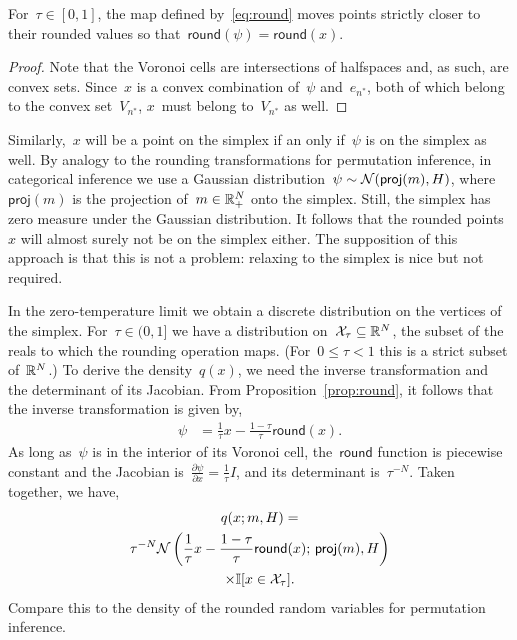 \begin{proposition}
  \label{prop:round}
  For~${\tau \in [0,1]}$, the map defined by~\eqref{eq:round} moves
  points strictly closer to their rounded values so
  that~$\mathsf{round}(\psi) = \mathsf{round}(x)$.
\end{proposition}

\begin{proof}
  Note that the Voronoi cells are intersections of halfspaces
  and, as such, are convex sets.  Since~$x$ is a convex combination
  of~$\psi$ and~$e_{n^*}$, both of which belong to the convex
  set~$V_{n^*}$, $x$~must belong to~$V_{n^*}$ as well.
\end{proof}

Similarly,~$x$ will be a point on the simplex if an only if~$\psi$ is
on the simplex as well.  By analogy to the rounding transformations
for permutation inference, in categorical inference we use a Gaussian
distribution~${\psi \sim \mathcal{N}(\mathsf{proj}(m), H)}$,
where~$\mathsf{proj}(m)$ is the projection of~$m \in \mathbb{R}_+^N$ onto
the simplex.  Still, the simplex has zero measure under the Gaussian
distribution.  It follows that the rounded points~$x$ will almost
surely not be on the simplex either.  The supposition of this approach
is that this is not a problem: relaxing to the simplex is nice but not
required.

In the zero-temperature limit we obtain a discrete distribution on the
vertices of the simplex.  For~${\tau \in (0,1]}$ we have a
distribution on~${\mathcal{X}_\tau \subseteq \mathbb{R}^N}$, the subset of the
reals to which the rounding operation maps. (For~${0 \leq \tau < 1}$
this is a strict subset of~$\mathbb{R}^N$.) To derive the
density~$q(x)$, we need the inverse transformation and the
determinant of its Jacobian.  From Proposition~\ref{prop:round}, it
follows that the inverse transformation is given by,
\begin{align*}
  \psi &= \frac{1}{\tau} x - \frac{1 - \tau}{\tau} \mathsf{round}(x).
\end{align*}
As long as~$\psi$ is in the interior of its Voronoi cell,
the~$\mathsf{round}$ function is piecewise constant and the
Jacobian is~${\tfrac{\partial\psi}{\partial x} = \tfrac{1}{\tau} I}$,
and its determinant is~$\tau^{-N}$. Taken together, we have,
\begin{multline*}
  q(x; m, H) =  \\
  \tau^{-N} \mathcal{N} \left(\frac{1}{\tau}x - \frac{1-\tau}{\tau} \mathsf{round}(x); \, \mathsf{proj}(m), H \right) \\
  \times \mathbb{I}[x \in \mathcal{X}_\tau].
\end{multline*}
Compare this to the density of the rounded random variables for
permutation inference. 

